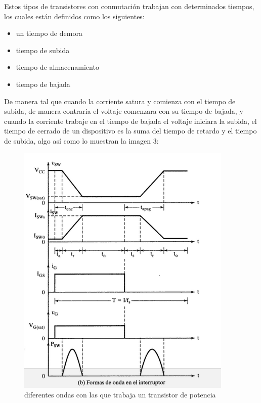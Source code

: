 \documentclass[11pt,a4paper]{article}
\begin{document}
Estos tipos de transistores con conmutación trabajan con determinados tiempos, los cuales están definidos como los siguientes:

\begin{itemize}

\item un tiempo de demora
\item tiempo de subida
\item tiempo de almacenamiento
\item tiempo de bajada

\end{itemize}

\newpage

De manera tal que cuando la corriente satura y comienza con el tiempo de subida, de manera contraria el voltaje comenzara con su tiempo de bajada, y cuando la corriente trabaje en el tiempo de bajada el voltaje iniciara la subida, el tiempo de cerrado de un dispositivo es la suma del tiempo de retardo y el tiempo de subida, algo así como lo muestran la imagen 3:

\begin{figure}[h]
\begin{center}
\includegraphics[scale=0.6]{4.png}
\caption{diferentes ondas con las que trabaja un transistor de potencia}
\end{center}
\end{figure}
\end{document}
